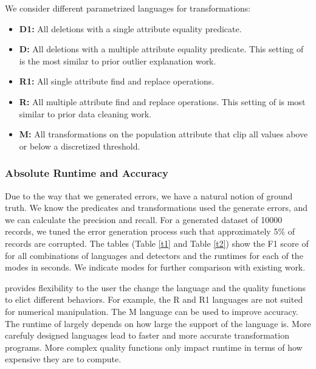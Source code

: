 We consider different parametrized languages for transformations:
\begin{itemize}
    \item \textbf{D1: } All deletions with a single attribute equality predicate.

    \item \textbf{D: } All deletions with a multiple attribute equality predicate. This setting of \sys is the most similar to prior outlier explanation work.

    \item \textbf{R1: } All single attribute find and replace operations.

    \item \textbf{R: } All multiple attribute find and replace operations. This setting of \sys is most similar to prior data cleaning work.

    \item \textbf{M: } All transformations on the population attribute that clip all values above or below a discretized threshold.
\end{itemize}

\subsubsection{Absolute Runtime and Accuracy}
Due to the way that we generated errors, we have a natural notion of ground truth. We know the predicates and transformations used the generate errors, and we can calculate the precision and recall. For a generated dataset of 10000 records, we tuned the error generation process such that approximately 5\% of records are corrupted. The tables (Table \ref{t1} and Table \ref{t2}) show the F1 score of \sys for all combinations of languages and detectors and the runtimes for each of the modes in seconds. We indicate modes for further comparison with existing work. 

\sys provides flexibility to the user the change the language and the quality functions to elict different behaviors. For example, the R and R1 languages are not suited for numerical manipulation. The M language can be used to improve accuracy. The runtime of \sys largely depends on how large the support of the language is. More carefuly designed languages lead to faster and more accurate transformation programs. More complex quality functions only impact runtime in terms of how expensive they are to compute.

